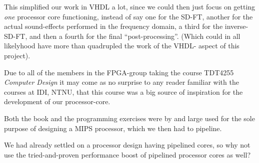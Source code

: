 This simplified our work in VHDL a lot, since we could then just focus on
getting \emph{one} processor core functioning, instead of say one for the SD-FT,
another for the actual sound-effects performed in the frequency domain, a third
for the inverse-SD-FT, and then a fourth for the final ``post-processing''.
(Which could in all likelyhood have more than quadrupled the work of the VHDL-
aspect of this project).

Due to all of the members in the FPGA-group taking the course TDT4255 \emph{Computer Design}
it may come as no surprise to any reader familiar with the courses at IDI, NTNU,
that this course was a big source of inspiration for the development of our
processor-core.

Both the  book and the programming
exercises were by and large used for the sole purpose of designing a MIPS
processor, which we then had to pipeline.

We had already settled on a processor design having pipelined cores, so why not
use the tried-and-proven performance boost of pipelined processor cores as well?
